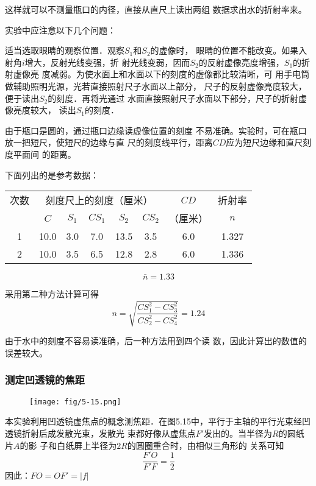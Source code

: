 这样就可以不测量瓶口的内径，直接从直尺上读出两组
数据求出水的折射率来。

实验中应注意以下几个问题：

适当选取眼睛的观察位置．观察$S_1$和$S_2$的虚像时，
眼睛的位置不能改变。如果入射角$i$增大，反射光线变强，折
射光线变弱，因而$S_2$的反射虚像亮度增强，$S_1$的折射虚像亮
度减弱。为使水面上和水面以下的刻度的虚像都比较清晰，可
用手电筒做辅助照明光源，光若直接照射尺子水面以上部分，
尺子的反射虚像亮度较大，便于读出$S_2$的刻度．再将光通过
水面直接照射尺子水面以下部分，尺子的折射虚像亮度较大，
读出$S_1$的刻度．

由于瓶口是圆的，通过瓶口边缘读虚像位置的刻度
不易准确。实验时，可在瓶口放一把短尺，使短尺的边缘与直
尺的刻度线平行，距离$CD$应为短尺边缘和直尺刻度平面间
的距离。

下面列出的是参考数据：
\begin{center}
\begin{tabular}{c|ccccc|c|c}
\hline
次数& \multicolumn{5}{|c|}{刻度尺上的刻度（厘米）}&$CD$& 折射率\\
\cline{2-6}
& $C$&$S_1$&$CS_1$&$S_2$&$CS_2$&  （厘米）& $n$    \\
\hline
1   &    10.0   &    3.0   &    7.0   &    13.5   &    3.5   &    6.0   &    1.327   \\
   2   &    10.0   &    3.5   &    6.5   &    12.8   &    2.8   &    6.0   &    1.336  \\
\hline
\end{tabular}
\[\bar n=1.33\]
\end{center}

采用第二种方法计算可得
\[n=\sqrt{\frac{CS_1^2-CS_3^2}{CS_2^2-CS_4^2}}=1.24\]

由于水中的刻度不容易读准确，后一种方法用到四个读
数，因此计算出的数值的误差较大。

\subsubsection{测定凹透镜的焦距}

\begin{figure}[htp]
    \centering
    \texttt{[image: fig/5-15.png]}
    \caption{}
\end{figure}

本实验利用凹透镜虚焦点的概念测焦距．在图5.15中，平行于主轴的平行光束经凹透镜折射后成发散光束，发散光
束都好像从虚焦点$F'$发出的。当半径为$R$的圆纸片$A$的影
子和白纸屏上半径为$2R$的圆圈重合时，由相似三角形的
关系可知
\[\frac{F'O}{F'F}=\frac{1}{2}\]
因此：$FO=OF'=|f|$

